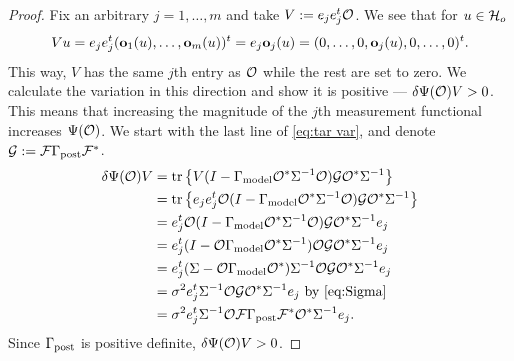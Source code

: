 \documentclass{amsart}
\numberwithin{equation}{section}
\begin{document}
\biggerbetter
\begin{proof} 
  Fix an arbitrary $j=1,\dots,m$ and take $V:= e_j e_j^t \mathcal{O}$. We see
  that for $u \in \mathcal{H}_o$
  \begin{equation*}
    Vu = e_je_j^t (\mathbf{o}_1(u),\dots,\mathbf{o}_m(u) )^t = e_j \mathbf{o}_j(u)
    = (0,\dots,0,\mathbf{o}_j(u),0,\dots,0)^t.
  \end{equation*}
  This way, $V$ has the same $j$th entry as $\mathcal{O}$ while the rest are
  set to zero. We calculate the variation in this direction and show
  it is positive --- $\delta \Psi(\mathcal{O})V > 0$. This means that
  increasing the magnitude of the $j$th measurement functional
  increases $\Psi(\mathcal{O})$. We start with the last line of \eqref{eq:tar var}, and denote $\mathcal{G} : = \mathcal{F} \Gamma_{\textup{post}} \mathcal{F}^*$.
  \begin{align*}
     \delta \Psi(\mathcal{O}) V 
    &= \textup{tr}\left \{V ( I - \Gamma_{\textup{model}} \mathcal{O}^*\Sigma^{-1}\mathcal{O}) \mathcal{G} \mathcal{O}^* \Sigma^{-1} \right \} \\
    &= \textup{tr}\left \{e_je_j^t \mathcal{O} ( I - \Gamma_{\textup{model}} \mathcal{O}^*\Sigma^{-1}\mathcal{O}) \mathcal{G} \mathcal{O}^* \Sigma^{-1} \right \} \\
    &= e_j^t \mathcal{O} ( I - \Gamma_{\textup{model}} \mathcal{O}^*\Sigma^{-1}\mathcal{O}) \mathcal{G} \mathcal{O}^* \Sigma^{-1}e_j \\
    &= e_j^t ( I - \mathcal{O} \Gamma_{\textup{model}} \mathcal{O}^*\Sigma^{-1})\mathcal{O} \mathcal{G} \mathcal{O}^* \Sigma^{-1}e_j \\  
    &=  e_j^t(\Sigma-\mathcal{O} \Gamma_{\textup{model}} \mathcal{O}^*) \Sigma^{-1}\mathcal{O} \mathcal{G} \mathcal{O}^* \Sigma^{-1}e_j \\
    &=\sigma^2 e_j^t \Sigma^{-1}\mathcal{O} \mathcal{G} \mathcal{O}^* \Sigma^{-1}e_j
    \text{ by \eqref{eq:Sigma} }\\
    &=\sigma^2 e_j^t \Sigma^{-1}\mathcal{O} \mathcal{F} \Gamma_{\textup{post}} \mathcal{F}^* \mathcal{O}^* \Sigma^{-1}e_j.
  \end{align*} 
  Since $\Gamma_{\textup{post}}$ is positive definite, $\delta \Psi(\mathcal{O}) V > 0$.
\end{proof}





\end{document}
